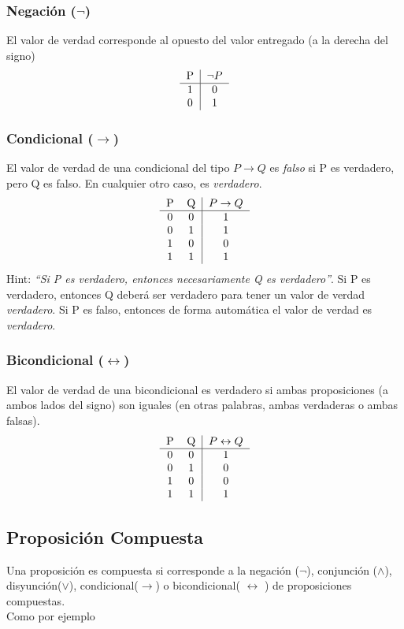 \documentclass[../main.tex]{subfiles}
\begin{document}
\subsubsection{Negación ($\neg$)}
El valor de verdad corresponde al opuesto del valor entregado (a la derecha del signo)
\[
    \begin{tabular}{c|c}
        P & $\neg{}P$\\ \hline
        1 & 0\\
        0 & 1 
    \end{tabular}
\]

\subsubsection{Condicional ($\rightarrow$)}
El valor de verdad de una condicional del tipo $P \rightarrow{}Q$ es \textit{falso} si P es verdadero, pero Q es falso. En cualquier otro caso, es \textit{verdadero}.\\
\[
    \begin{tabular}{cc|c}
        P & Q & $P \rightarrow{}Q$\\ \hline
        0 & 0 & 1\\
        0 & 1 & 1\\
        1 & 0 & 0\\
        1 & 1 & 1
    \end{tabular}
\]
Hint: \textit{``Si P es verdadero, entonces necesariamente Q es verdadero''}. Si P es verdadero, entonces Q deberá ser verdadero para tener un valor de verdad \textit{verdadero}. Si P es falso, entonces de forma automática el valor de verdad es \textit{verdadero}.

\subsubsection{Bicondicional ($\leftrightarrow$)}
El valor de verdad de una bicondicional es verdadero si ambas proposiciones (a ambos lados del signo) son iguales (en otras palabras, ambas verdaderas o ambas falsas).
\[
    \begin{tabular}{cc|c}
        P & Q & $P \leftrightarrow{}Q$\\ \hline
        0 & 0 & 1\\
        0 & 1 & 0\\
        1 & 0 & 0\\
        1 & 1 & 1
    \end{tabular}
\]

\subsection{Proposición Compuesta}
Una proposición es compuesta si corresponde a la negación ($\neg$), conjunción ($\wedge$), disyunción($\vee$), condicional($\rightarrow$) o bicondicional( $\leftrightarrow$ ) de proposiciones compuestas.\\
Como por ejemplo
\end{document}
